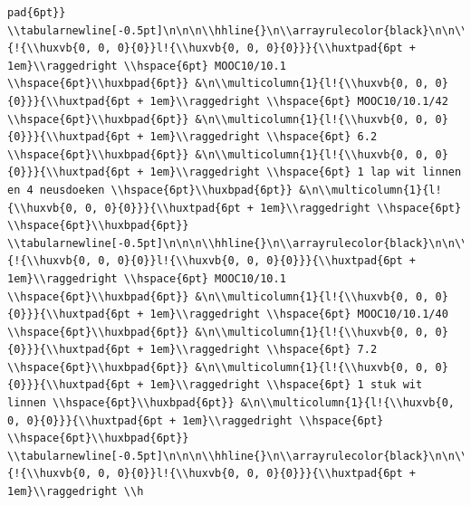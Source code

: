 \documentclass[11pt,preprint, authoryear]{elsarticle}
\numberwithin{equation}{section}
\numberwithin{figure}{section}
\numberwithin{table}{section}
\begin{document}
\begin{verbatim}
pad{6pt}} \\tabularnewline[-0.5pt]\n\n\n\\hhline{}\n\\arrayrulecolor{black}\n\n\\multicolumn{1}{!{\\huxvb{0, 0, 0}{0}}l!{\\huxvb{0, 0, 0}{0}}}{\\huxtpad{6pt + 1em}\\raggedright \\hspace{6pt} MOOC10/10.1 \\hspace{6pt}\\huxbpad{6pt}} &\n\\multicolumn{1}{l!{\\huxvb{0, 0, 0}{0}}}{\\huxtpad{6pt + 1em}\\raggedright \\hspace{6pt} MOOC10/10.1/42 \\hspace{6pt}\\huxbpad{6pt}} &\n\\multicolumn{1}{l!{\\huxvb{0, 0, 0}{0}}}{\\huxtpad{6pt + 1em}\\raggedright \\hspace{6pt} 6.2 \\hspace{6pt}\\huxbpad{6pt}} &\n\\multicolumn{1}{l!{\\huxvb{0, 0, 0}{0}}}{\\huxtpad{6pt + 1em}\\raggedright \\hspace{6pt} 1 lap wit linnen en 4 neusdoeken \\hspace{6pt}\\huxbpad{6pt}} &\n\\multicolumn{1}{l!{\\huxvb{0, 0, 0}{0}}}{\\huxtpad{6pt + 1em}\\raggedright \\hspace{6pt}  \\hspace{6pt}\\huxbpad{6pt}} \\tabularnewline[-0.5pt]\n\n\n\\hhline{}\n\\arrayrulecolor{black}\n\n\\multicolumn{1}{!{\\huxvb{0, 0, 0}{0}}l!{\\huxvb{0, 0, 0}{0}}}{\\huxtpad{6pt + 1em}\\raggedright \\hspace{6pt} MOOC10/10.1 \\hspace{6pt}\\huxbpad{6pt}} &\n\\multicolumn{1}{l!{\\huxvb{0, 0, 0}{0}}}{\\huxtpad{6pt + 1em}\\raggedright \\hspace{6pt} MOOC10/10.1/40 \\hspace{6pt}\\huxbpad{6pt}} &\n\\multicolumn{1}{l!{\\huxvb{0, 0, 0}{0}}}{\\huxtpad{6pt + 1em}\\raggedright \\hspace{6pt} 7.2 \\hspace{6pt}\\huxbpad{6pt}} &\n\\multicolumn{1}{l!{\\huxvb{0, 0, 0}{0}}}{\\huxtpad{6pt + 1em}\\raggedright \\hspace{6pt} 1 stuk wit linnen \\hspace{6pt}\\huxbpad{6pt}} &\n\\multicolumn{1}{l!{\\huxvb{0, 0, 0}{0}}}{\\huxtpad{6pt + 1em}\\raggedright \\hspace{6pt}  \\hspace{6pt}\\huxbpad{6pt}} \\tabularnewline[-0.5pt]\n\n\n\\hhline{}\n\\arrayrulecolor{black}\n\n\\multicolumn{1}{!{\\huxvb{0, 0, 0}{0}}l!{\\huxvb{0, 0, 0}{0}}}{\\huxtpad{6pt + 1em}\\raggedright \\h
\end{verbatim}
\end{document}
